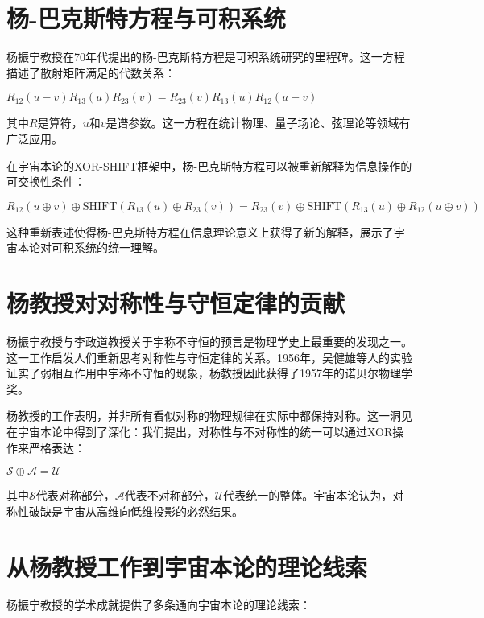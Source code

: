 \section{杨-巴克斯特方程与可积系统}

杨振宁教授在70年代提出的杨-巴克斯特方程是可积系统研究的里程碑。这一方程描述了散射矩阵满足的代数关系：

$R_{12}(u-v)R_{13}(u)R_{23}(v) = R_{23}(v)R_{13}(u)R_{12}(u-v)$

其中$R$是算符，$u$和$v$是谱参数。这一方程在统计物理、量子场论、弦理论等领域有广泛应用。

在宇宙本论的XOR-SHIFT框架中，杨-巴克斯特方程可以被重新解释为信息操作的可交换性条件：

$R_{12}(u \oplus v) \oplus \text{SHIFT}(R_{13}(u) \oplus R_{23}(v)) = R_{23}(v) \oplus \text{SHIFT}(R_{13}(u) \oplus R_{12}(u \oplus v))$

这种重新表述使得杨-巴克斯特方程在信息理论意义上获得了新的解释，展示了宇宙本论对可积系统的统一理解。

\section{杨教授对对称性与守恒定律的贡献}

杨振宁教授与李政道教授关于宇称不守恒的预言是物理学史上最重要的发现之一。这一工作启发人们重新思考对称性与守恒定律的关系。1956年，吴健雄等人的实验证实了弱相互作用中宇称不守恒的现象，杨教授因此获得了1957年的诺贝尔物理学奖。

杨教授的工作表明，并非所有看似对称的物理规律在实际中都保持对称。这一洞见在宇宙本论中得到了深化：我们提出，对称性与不对称性的统一可以通过XOR操作来严格表达：

$\mathcal{S} \oplus \mathcal{A} = \mathcal{U}$

其中$\mathcal{S}$代表对称部分，$\mathcal{A}$代表不对称部分，$\mathcal{U}$代表统一的整体。宇宙本论认为，对称性破缺是宇宙从高维向低维投影的必然结果。

\section{从杨教授工作到宇宙本论的理论线索}

杨振宁教授的学术成就提供了多条通向宇宙本论的理论线索：

